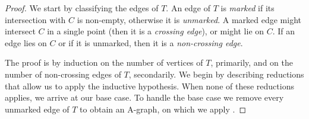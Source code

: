 \begin{proof}
We start by classifying the edges of $T$. An edge of $T$ is \emph{marked} if its intersection with $C$ is non-empty, otherwise it is \emph{unmarked}. A marked edge might intersect $C$ in a single point (then it is a \emph{crossing edge}), or might lie on $C$. If an edge lies on $C$ or if it is unmarked, then it is a \emph{non-crossing edge}. 
	
	
	
	The proof is by induction on the number of vertices of $T$, primarily, and on the number of non-crossing edges of $T$, secondarily.
	We begin by describing reductions that allow us to apply the
	inductive hypothesis. When none of these reductions applies,
	we arrive at our base case. To handle the base case 
	we remove every unmarked edge of $T$ to obtain an A-graph, on which we
	apply .

	

\end{proof}
